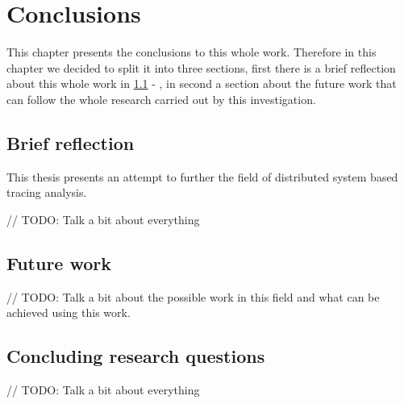 \glsresetall
\chapter{Conclusions}
\label{chap:conclusions}

This chapter presents the conclusions to this whole work. Therefore in this chapter we decided to split it into three sections, first there is a brief reflection about this whole work in \ref{sec:brief_reflection} - , in second a section about the future work that can follow the whole research carried out by this investigation.

\section{Brief reflection}
\label{sec:brief_reflection}

This thesis presents an attempt to further the field of distributed system based tracing analysis.

// TODO: Talk a bit about everything


\section{Future work}
\label{sec:future_work}

// TODO: Talk a bit about the possible work in this field and what can be achieved using this work.


\section{Concluding research questions}
\label{sec:concluding_research_questions}

// TODO: Talk a bit about everything


\checkoddpage
{}
{ %
\newpage
\blankpage}
{ %
}
